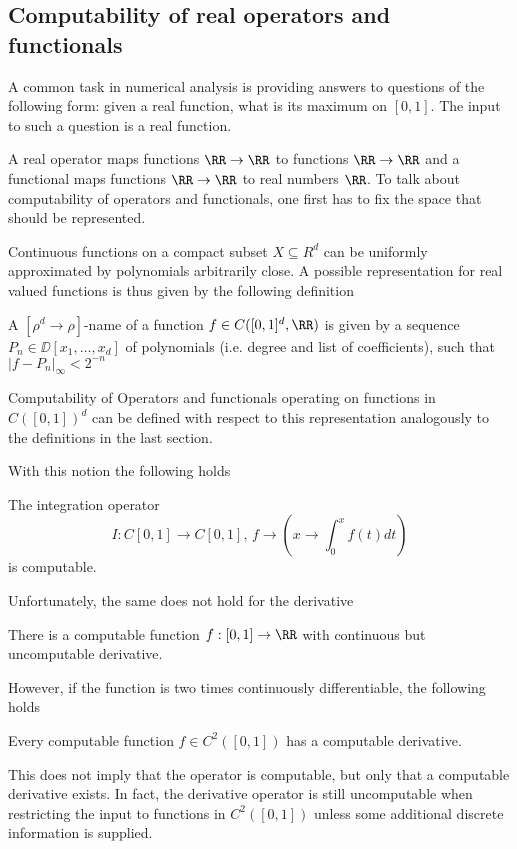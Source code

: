 \subsection{Computability of real operators and functionals}
A common task in numerical analysis is providing answers to questions of the
following form: given a real function, what is its maximum on $[0,1]$.
The input to such a question is a real function.

A real operator maps functions $\RR \to \RR$ to functions $\RR \to \RR$ and a functional maps functions $\RR \to \RR$ to real numbers $\RR$.
To talk about computability of operators and functionals, one first has to fix
the space that should be represented.

Continuous functions on a compact subset $X \subseteq R^d$ can be uniformly approximated by polynomials arbitrarily close.
A possible representation for real valued functions is thus given by the following definition 
\begin{definition}
A $[\rho^d \to \rho]$-name of a function $f \in C([0,1]^d, \RR)$ is given by a
sequence $P_n \in \DD[x_1, \dots, x_d]$ of polynomials (i.e. degree and list of
coefficients), such that $\vert f - P_n \vert_\infty < 2^{-n}$
\end{definition}
Computability of Operators and functionals operating on functions in
$C([0,1])^d$ can be defined with respect to this representation analogously to
the definitions in the last section.

With this notion the following holds
\begin{theorem}
The integration operator 
$$I: C[0,1] \to C[0,1],\, f \to \left(x \to \int_0^x f(t) dt\right)$$   
is computable.
\end{theorem}
Unfortunately, the same does not hold for the derivative
\begin{theorem}[Myhill 1971]
There is a computable function $f: [0,1] \to \RR$ with continuous but uncomputable derivative. 
\end{theorem}
However, if the function is two times continuously differentiable, the
following holds
\begin{theorem}
  Every computable function $f \in C^2([0,1])$ has a computable derivative.
\end{theorem}
This does not imply that the operator is computable, but only that
a computable derivative exists. 
In fact, the derivative operator is still uncomputable when restricting the
input to functions in $C^2([0,1])$ unless some additional discrete information
is supplied. 

